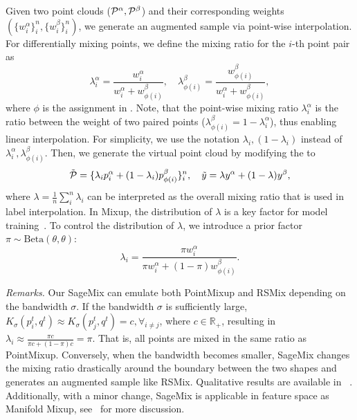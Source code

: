 \documentclass{article}
\begin{document}
Given two point clouds ($\Point^\alpha, \Point^\beta$) and their corresponding weights $(\{w^\alpha_i\}^n_i, \{w^\beta_i\}^n_i)$, we generate an augmented sample via point-wise interpolation. 
For differentially mixing points, we define the mixing ratio for the $i$-th point pair as
\begin{equation}
\lambda^\alpha_i = \frac{w^\alpha_i}{w^\alpha_i + w^\beta_{\phi(i)}},\quad \lambda^\beta_{\phi(i)} = \frac{w^\beta_{\phi(i)}}{w^\alpha_i + w^\beta_{\phi(i)}},
\label{eq:lambda}
\end{equation}
where $\phi$ is the assignment in . Note, that the point-wise mixing ratio $\lambda^\alpha_i$ is the ratio between the weight of two paired points (\ie $\lambda^\beta_{\phi(i)} = 1 - \lambda^\alpha_i$), thus enabling linear interpolation. For simplicity, we use the notation $\lambda_i, (1-\lambda_i)$ instead of $\lambda^\alpha_i, \lambda^\beta_{\phi(i)}$.
Then, we generate the virtual point cloud by modifying the  to
\begin{equation}
\tilde{\Point} = \{\lambda_i\point^\alpha_i + (1-\lambda_i)\point^\beta_{\phi(i)}\}^n_i,\quad \tilde{y} = \lambda y^\alpha + (1- \lambda) y^\beta,
\label{eq:temp}
\end{equation}
where $\lambda = \frac{1}{n}\sum^n_i\lambda_i$ can be interpreted as the overall mixing ratio that is used in label interpolation. 
In Mixup, the distribution of $\lambda$ is a key factor for model training~\cite{DBLP:conf/iclr/ZhangCDL18}.
To control the distribution of $\lambda$, we introduce a prior factor $\pi \sim \text{Beta}(\theta,\theta)$: 
\begin{equation}
\lambda_i = \frac{\pi w^\alpha_i}{\pi w^\alpha_i +  (1-\pi)w^\beta_{\phi(i)}}.
\label{eq:lambda_final}
\end{equation}


\textit{Remarks.} 
Our SageMix can emulate both PointMixup and RSMix depending on the bandwidth $\sigma$.
If the bandwidth $\sigma$ is sufficiently large, $K_\sigma(p^t_i,q^t) \approx K_\sigma(p^t_j,q^t) =c, \forall_{i \neq j}$, where $c\in \mathbb{R}_{+}$, resulting in $\lambda_i \approx \frac{\pi c}{\pi c +  (1-\pi)c} = \pi$. That is, all points are mixed in the same ratio as PointMixup. 
Conversely, when the bandwidth becomes smaller, SageMix changes the mixing ratio drastically around the boundary between the two shapes and generates an augmented sample like RSMix. 
Qualitative results are available in ~. Additionally, with a minor change, SageMix is applicable in feature space as Manifold Mixup, see~ for more discussion.
\end{document}
